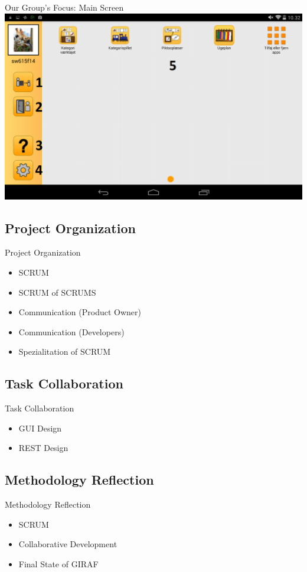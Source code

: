 \begin{frame}{Our Group's Focus: Main Screen}
\includegraphics[scale=0.28]{figures/MenuGuardian.png} 
\end{frame}

\subsection{Project Organization}
\begin{frame}{Project Organization}
\begin{itemize} 
	\item SCRUM
	\item SCRUM of SCRUMS
	\item Communication (Product Owner)
	\item Communication (Developers)
	\item Spezialitation of SCRUM
\end{itemize}
\end{frame}

\subsection{Task Collaboration}
\begin{frame}{Task Collaboration}
\begin{itemize} 
	\item GUI Design
	\item REST Design
\end{itemize}
\end{frame}

\subsection{Methodology Reflection}
\begin{frame}{Methodology Reflection}
\begin{itemize} 
	\item SCRUM
	\item Collaborative Development
	\item Final State of GIRAF
\end{itemize}
\end{frame}
















